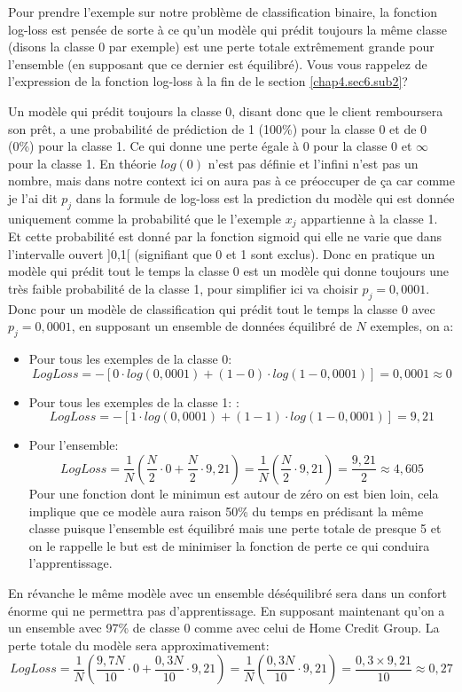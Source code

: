 Pour prendre l'exemple sur notre problème de classification binaire, la fonction log-loss est pensée de sorte à ce qu'un modèle qui prédit toujours la même classe (disons la classe 0 par exemple) est une perte totale extrêmement grande pour l'ensemble (en supposant que ce dernier est équilibré). Vous vous rappelez de l'expression de la fonction log-loss à la fin de le section \ref{chap4.sec6.sub2}?

Un modèle qui prédit toujours la classe 0, disant donc que le client remboursera son prêt, a une probabilité de prédiction de 1 (100\%) pour la classe 0 et de 0 (0\%) pour la classe 1. Ce qui donne une perte égale à 0 pour la classe 0 et \(\infty\) pour la classe 1. En théorie \(log(0)\) n'est pas définie et l'infini n'est pas un nombre, mais dans notre context ici on aura pas à ce préoccuper de ça car comme je l'ai dit \(p_j\) dans la formule de log-loss est la prediction du modèle qui est donnée uniquement comme la probabilité que le l'exemple \(x_j\) appartienne à la classe 1. Et cette probabilité est donné par la fonction sigmoid qui elle ne varie que dans l'intervalle ouvert ]0,1[ (signifiant que 0 et 1 sont exclus). Donc en pratique un modèle qui prédit tout le temps la classe 0 est un modèle qui donne toujours une très faible probabilité de la classe 1, pour simplifier ici va choisir \(p_j = 0,0001\). Donc pour un modèle de classification qui prédit tout le temps la classe 0 avec \(p_j = 0,0001\), en supposant un ensemble de données équilibré de \(N\) exemples, on a:

\begin{itemize}
    \item Pour tous les exemples de la classe 0:\[LogLoss = - [0 \cdot log(0,0001) + (1 − 0)\cdot log(1−0,0001)] = 0,0001 \approx 0\]
    \item Pour tous les exemples de la classe 1: :\[LogLoss = - [1 \cdot log(0,0001) + (1 − 1)\cdot log(1−0,0001)] = 9,21\]
    \item Pour l'ensemble: \[LogLoss = \frac{1}{N}(\frac{N}{2} \cdot 0 + \frac{N}{2} \cdot 9,21) = \frac{1}{N}(\frac{N}{2} \cdot 9,21) = \frac{9,21}{2} \approx 4,605\] Pour une fonction dont le minimun est autour de zéro on est bien loin, cela implique que ce modèle aura raison 50\% du temps en prédisant la même classe puisque l'ensemble est équilibré mais une perte totale de presque 5 et on le rappelle le but est de minimiser la fonction de perte ce qui conduira l'apprentissage.
\end{itemize}

En révanche le même modèle avec un ensemble déséquilibré sera dans un confort énorme qui ne permettra pas d'apprentissage. En supposant maintenant qu'on a un ensemble avec 97\% de classe 0 comme avec celui de Home Credit Group. La perte totale du modèle sera approximativement: \[LogLoss = \frac{1}{N}(\frac{9,7 N}{10} \cdot 0 + \frac{0,3 N}{10} \cdot 9,21) = \frac{1}{N}(\frac{0,3 N}{10} \cdot 9,21) = \frac{0,3 \times 9,21}{10} \approx 0,27\]

